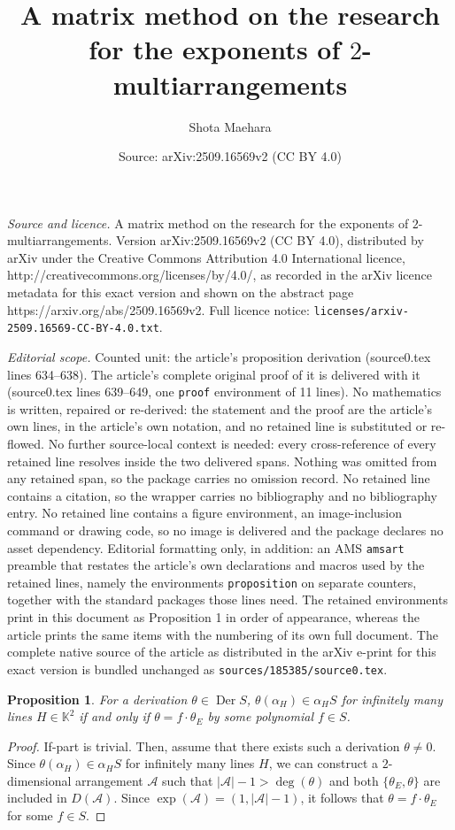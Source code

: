 \documentclass[10pt,a4paper]{amsart}
\title{A matrix method on the research for the exponents of $2$-multiarrangements}
\author{Shota Maehara}
\date{Source: arXiv:2509.16569v2 (CC BY 4.0)}
\newtheorem{proposition}{Proposition}
\newcommand{\AAA}{\mathcal{A}}
\newcommand{\Der}{\operatorname{Der}}
\newcommand{\KK}{\mathbb{K}}
\begin{document}
\maketitle

\noindent\emph{Source and licence.} A matrix method on the research for the exponents of $2$-multiarrangements. Version arXiv:2509.16569v2 (CC BY 4.0), distributed by arXiv under the Creative Commons Attribution 4.0 International licence, http://creativecommons.org/licenses/by/4.0/, as recorded in the arXiv licence metadata for this exact version and shown on the abstract page https://arxiv.org/abs/2509.16569v2. Full licence notice: \texttt{licenses/arxiv-2509.16569-CC-BY-4.0.txt}.\par\smallskip

\noindent\textit{Editorial scope.} Counted unit: the article's proposition derivation (source0.tex lines 634--638). The article's complete original proof of it is delivered with it (source0.tex lines 639--649, one \texttt{proof} environment of 11 lines). No mathematics is written, repaired or re-derived: the statement and the proof are the article's own lines, in the article's own notation, and no retained line is substituted or re-flowed.  No further source-local context is needed: every cross-reference of every retained line resolves inside the two delivered spans.  Nothing was omitted from any retained span, so the package carries no omission record.  No retained line contains a citation, so the wrapper carries no bibliography and no bibliography entry.  No retained line contains a figure environment, an image-inclusion command or drawing code, so no image is delivered and the package declares no asset dependency.  Editorial formatting only, in addition: an AMS \texttt{amsart} preamble that restates the article's own declarations and macros used by the retained lines, namely the environments \texttt{proposition} on separate counters, together with the standard packages those lines need.  The retained environments print in this document as Proposition 1 in order of appearance, whereas the article prints the same items with the numbering of its own full document.  The complete native source of the article as distributed in the arXiv e-print for this exact version is bundled unchanged as \texttt{sources/185385/source0.tex}.
        \begin{proposition}\label{proposition:Euler derivation}
    For a derivation $\theta\in\Der S$, 
    $\theta(\alpha_H)\in\alpha_H S$ for infinitely many lines $H\in\KK^2$ 
    if and only if $\theta=f\cdot\theta_E$ by some polynomial $f\in S$. 
    \end{proposition}

\begin{proof}
    If-part is trivial. 
    Then, assume that there exists such a derivation $\theta\neq0$. 
    Since $\theta(\alpha_H)\in\alpha_H S$ for infinitely many lines $H$, 
    we can construct 
    a $2$-dimensional arrangement $\AAA$ such that $|\AAA|-1>\deg(\theta)$ and 
    both $\{\theta_E, \theta\}$ are included in $D(\AAA)$. 
    Since $\exp(\AAA)=(1,|\AAA|-1)$, it follows that 
    $\theta=f\cdot\theta_E$ for some $f\in S$. 
\end{proof}
\end{document}
